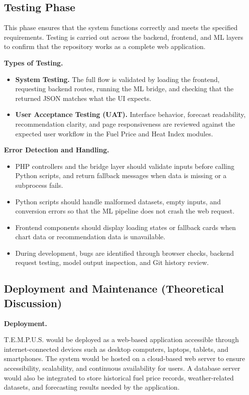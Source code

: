 \documentclass[12pt]{article}
\begin{document}
\subsection{Testing Phase}

This phase ensures that the system functions correctly and meets the specified requirements. Testing is carried out across the backend, frontend, and ML layers to confirm that the repository works as a complete web application.

\medskip
\noindent\textbf{Types of Testing.}
\begin{itemize}
    \item \textbf{System Testing.} The full flow is validated by loading the frontend, requesting backend routes, running the ML bridge, and checking that the returned JSON matches what the UI expects.
    \item \textbf{User Acceptance Testing (UAT).} Interface behavior, forecast readability, recommendation clarity, and page responsiveness are reviewed against the expected user workflow in the Fuel Price and Heat Index modules.
\end{itemize}

\medskip
\noindent\textbf{Error Detection and Handling.}
\begin{itemize}
    \item PHP controllers and the bridge layer should validate inputs before calling Python scripts, and return fallback messages when data is missing or a subprocess fails.
    \item Python scripts should handle malformed datasets, empty inputs, and conversion errors so that the ML pipeline does not crash the web request.
    \item Frontend components should display loading states or fallback cards when chart data or recommendation data is unavailable.
    \item During development, bugs are identified through browser checks, backend request testing, model output inspection, and Git history review.
\end{itemize}

\subsection{Deployment and Maintenance (Theoretical Discussion)}

\noindent\textbf{Deployment.}

T.E.M.P.U.S. would be deployed as a web-based application accessible through internet-connected devices such as desktop computers, laptops, tablets, and smartphones. The system would be hosted on a cloud-based web server to ensure accessibility, scalability, and continuous availability for users. A database server would also be integrated to store historical fuel price records, weather-related datasets, and forecasting results needed by the application.
\end{document}
